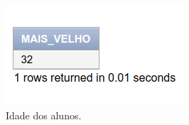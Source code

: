\documentclass[
article,			%
11pt,				%
oneside,			%
a4paper,			%
english,			%
brazil,				%
sumario=tradicional
]{abntex2}
\begin{document}
\begin{enumerate}
							\begin{center}
								\begin{figure}[H]
									\centering
									\includegraphics[scale=0.8]{./imagens/at-04.png}
									\caption{Idade dos alunos.}
									\label{rota-1}
								\end{figure}
							\end{center}
						
	\end{enumerate}				
			
\end{document}
